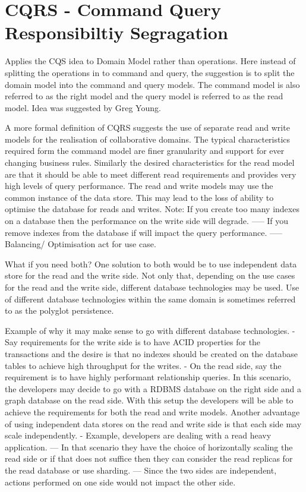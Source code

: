 

\section{CQRS - Command Query Responsibiltiy Segragation}
Applies the CQS idea to Domain Model rather than operations.
Here instead of splitting the operations in to command and query, the suggestion is to split the domain model into the command and query models.
The command model is also referred to as the right model and the query model is referred to as the read model.
Idea was suggested by Greg Young.

A more formal definition of CQRS suggests the use of separate read and write models for the realisation of collaborative domains.
The typical characteristics required form the command model are finer granularity and support for ever changing business rules.
Similarly the desired characteristics for the read model are that it should be able to meet different read requirements and provides very high levels of query performance.
The read and write models may use the common instance of the data store.
This may lead to the loss of ability to optimise the database for reads and writes.
Note: If you create too many indexes on a database then the performance on the write side will degrade.
----- If you remove indexes from the database if will impact the query performance.
----- Balancing/ Optimisation act for use case.

What if you need both?
One solution to both would be to use independent data store for the read and the write side.
Not only that, depending on the use cases for the read and the write side, different database technologies may be used.
Use of different database technologies within the same domain is sometimes referred to as the polyglot persistence.

Example of why it may make sense to go with different database technologies.
- Say requirements for the write side is to have ACID properties for the transactions and the desire is that no indexes should be created on the database tables to achieve high throughput for the writes.
- On the read side, say the requirement is to have highly performant relationship queries.
In this scenario, the developers may decide to go with a RDBMS database on the right side and a graph database on the read side.
With this setup the developers will be able to achieve the requirements for both the read and write models.
Another advantage of using independent data stores on the read and write side is that each side may scale independently.
- Example, developers are dealing with a read heavy application.
--- In that scenario they have the choice of horizontally scaling the read side or if that does not suffice then they can consider the read replicas for the read database or use sharding.
--- Since the two sides are independent, actions performed on one side would not impact the other side.

